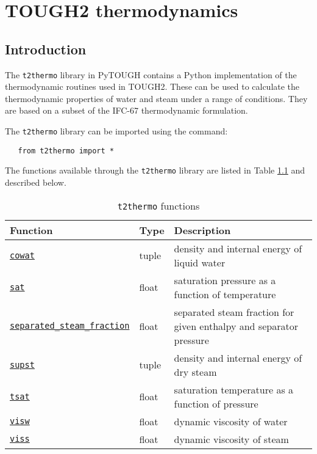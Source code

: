 \chapter{TOUGH2 thermodynamics}
\label{t2thermo}

\section{Introduction}
The \texttt{t2thermo} library in PyTOUGH contains a Python implementation of the thermodynamic routines used in TOUGH2.  These can be used to calculate the thermodynamic properties of water and steam under a range of conditions.  They are based on a subset of the IFC-67 thermodynamic formulation.

The \texttt{t2thermo} library can be imported using the command:

\begin{verbatim} 
   from t2thermo import *
\end{verbatim}

The functions available through the \texttt{t2thermo} library are listed in Table \ref{tb:t2thermo_functions} and described below.

\begin{table}
  \begin{center}
    \begin{tabular}{|l|l|p{65mm}|}
      \hline
      \textbf{Function} & \textbf{Type} & \textbf{Description}\\
      \hline
      \hyperref[sec:t2thermo:cowat]{\texttt{cowat}} & tuple & density and internal energy of liquid water\\
      \hyperref[sec:t2thermo:sat]{\texttt{sat}} & float & saturation pressure as a function of temperature\\
      \hyperref[sec:t2thermo:separated_steam_fraction]{\texttt{separated\_steam\_fraction}} & float & separated steam fraction for given enthalpy and separator pressure\\
      \hyperref[sec:t2thermo:supst]{\texttt{supst}} & tuple & density and internal energy of dry steam\\
      \hyperref[sec:t2thermo:tsat]{\texttt{tsat}} & float & saturation temperature as a function of pressure\\
      \hyperref[sec:t2thermo:visw]{\texttt{visw}} & float & dynamic viscosity of water\\
      \hyperref[sec:t2thermo:viss]{\texttt{viss}} & float & dynamic viscosity of steam\\
      \hline
    \end{tabular}
    \caption{\texttt{t2thermo} functions}
    \label{tb:t2thermo_functions}
  \end{center}
\end{table}

